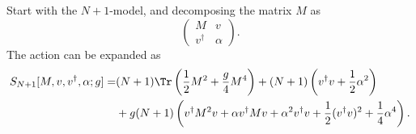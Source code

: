 Start with the $N+1$-model, and decomposing the matrix $M$ as
\begin{equation*}
\begin{pmatrix}
M & v\\ 
v^\dagger & \alpha
\end{pmatrix}.
\end{equation*}
The action can be expanded as
\begin{align}
S_{N+1}[M,v,v^\dagger,\alpha;g] 
= &(N + 1)\Tr\left( \frac{1}{2}M^2+\frac{g}{4}M^4\right) 
+ (N + 1) \left(v^\dagger v +\frac{1}{2}\alpha^2\right) \notag \\
&+ g(N+1)\left( v^\dagger M^2 v + \alpha v^\dagger M v 
+ \alpha^2 v^\dagger v + \frac{1}{2}(v^\dagger v)^2 
+\frac{1}{4}\alpha^4\right ).
\end{align}
%
